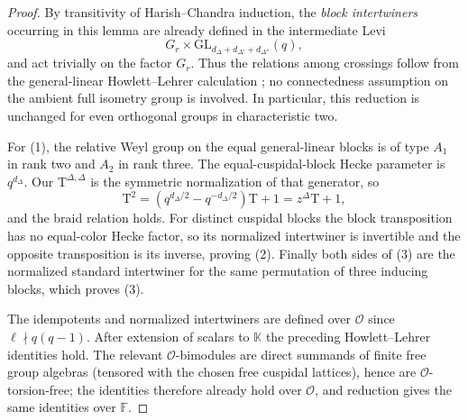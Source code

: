 \documentclass[12pt]{amsart}
\numberwithin{itemcounter}{subsection}
\theoremstyle{plain}
\theoremstyle{definition}
\theoremstyle{remark}
\numberwithin{equation}{section}
\def\GL{\mathrm{GL}}
\begin{document}
\begin{proof}
By transitivity of Harish--Chandra induction, the \emph{block intertwiners}
occurring in this lemma are already defined in the intermediate Levi
\[
 G_r\times\GL_{d_\Delta+d_{\Delta'}+d_{\Delta''}}(q),
\]
and act trivially on the factor $G_r$.  Thus the relations among crossings follow from
the general-linear Howlett--Lehrer calculation \cite{HL80}; no
connectedness assumption on the ambient full isometry group is involved.  In
particular, this reduction is unchanged for even orthogonal groups in
characteristic two.

For (1), the relative Weyl group on the equal general-linear blocks is of type
$A_1$ in rank two and $A_2$ in rank three.  The equal-cuspidal-block Hecke parameter is \(q^{d_\Delta}\).
Our $\mathrm{T}^{\Delta,\Delta}$ is the symmetric normalization of that generator, so
\[
 \mathrm{T}^2=(q^{d_\Delta/2}-q^{-d_\Delta/2})\mathrm{T}+1
      =z^\Delta\mathrm{T}+1,
\]
and the braid relation holds.  For distinct cuspidal blocks the block
transposition has no equal-color Hecke factor, so its normalized intertwiner
is invertible and the opposite transposition is its inverse, proving (2).
Finally both sides of (3) are the normalized standard intertwiner for the
same permutation of three inducing blocks, which proves (3).

The idempotents and normalized intertwiners are defined over $\mathcal O$
since $\ell\nmid q(q-1)$.  After extension of scalars
to $\mathbb K$ the preceding Howlett--Lehrer identities hold.  The relevant
$\mathcal O$-bimodules are direct summands of finite free group algebras
(tensored with the chosen free cuspidal lattices), hence are
$\mathcal O$-torsion-free; the identities therefore already hold over
$\mathcal O$, and reduction gives the same identities over $\mathbb F$.
\end{proof}
\end{document}
